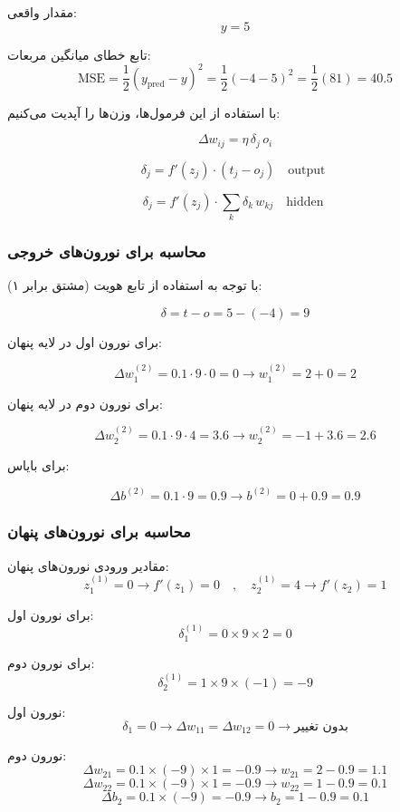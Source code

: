 مقدار واقعی:
\[
y = 5
\]

تابع خطای میانگین مربعات:
\[
\text{MSE} = \frac{1}{2}(y_{\text{pred}} - y)^2 = \frac{1}{2}(-4 - 5)^2 = \frac{1}{2}(81) = {40.5}
\]



با استفاده از این فرمول‌ها، وزن‌ها را آپدیت می‌کنیم:

\[
\Delta w_{ij} = \eta \, \delta_j \, o_i
\]

\[
\delta_j =  f'(z_j) \cdot (t_j - o_j) \quad \text{output }
\]

\[
\delta_j =  f'(z_j) \cdot \sum_k \delta_k \, w_{kj} \quad \text{hidden }
\]


\subsubsection*{محاسبه \lr{$\delta$} برای نورون‌های خروجی}

با توجه به استفاده از تابع هویت (مشتق برابر ۱):

\[
\delta = t - o = 5 - (-4) = 9
\]



برای نورون اول در لایه پنهان:

\[
\Delta w_1^{(2)} = 0.1 \cdot 9 \cdot 0 = 0
\longrightarrow w_1^{(2)} = 2 + 0 = 2
\]

برای نورون دوم در لایه پنهان:

\[
\Delta w_2^{(2)} = 0.1 \cdot 9 \cdot 4 = 3.6
\longrightarrow w_2^{(2)} = -1 + 3.6 = 2.6
\]


برای بایاس:

\[
\Delta b^{(2)} = 0.1 \cdot 9 = 0.9
\longrightarrow b^{(2)} = 0 + 0.9 = 0.9
\]


\subsubsection*{محاسبه \lr{$\delta$} برای نورون‌های پنهان}

مقادیر ورودی نورون‌های پنهان:
\[
z_1^{(1)} = 0 \longrightarrow f'(z_1) = 0
\quad , \quad
z_2^{(1)} = 4 \longrightarrow f'(z_2) = 1
\]


برای نورون اول:
\[
\delta_1^{(1)} = 0 \times 9 \times 2 = 0
\]

برای نورون دوم:
\[
\delta_2^{(1)} = 1 \times 9 \times (-1) = -9
\]


نورون اول:
\[
\delta_1 = 0 \longrightarrow \Delta w_{11} = \Delta w_{12} = 0 \longrightarrow \text{بدون تغییر}
\]

نورون دوم:
\[
\Delta w_{21} = 0.1 \times (-9) \times 1 = -0.9  \longrightarrow w_{21} = 2 - 0.9 = 1.1
\]
\[
\Delta w_{22} = 0.1 \times (-9) \times 1 = -0.9  \longrightarrow w_{22} = 1 - 0.9 = 0.1
\]
\[
\Delta b_2 = 0.1 \times (-9) = -0.9  \longrightarrow b_2 = 1 - 0.9 = 0.1
\]



